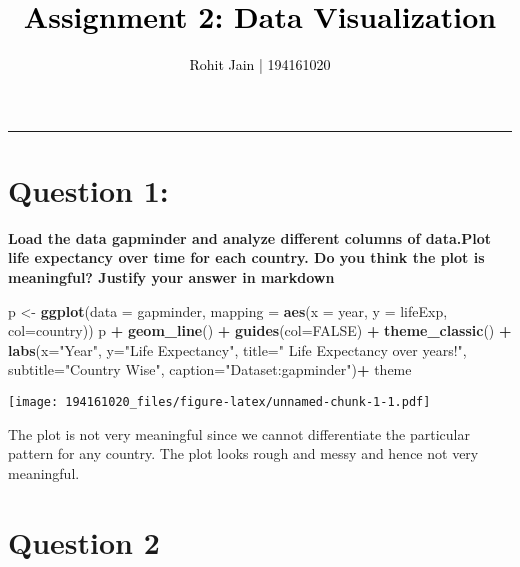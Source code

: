 \documentclass[
]{article}
\title{\textcolor{black}{Assignment 2: Data Visualization}}
\author{\textcolor{black}{Rohit Jain 	 | 	194161020}}
\date{}
\newenvironment{Shaded}{\begin{snugshade}}{\end{snugshade}}
\newcommand{\DataTypeTok}[1]{\textcolor[rgb]{0.13,0.29,0.53}{#1}}
\newcommand{\KeywordTok}[1]{\textcolor[rgb]{0.13,0.29,0.53}{\textbf{#1}}}
\newcommand{\NormalTok}[1]{#1}
\newcommand{\OperatorTok}[1]{\textcolor[rgb]{0.81,0.36,0.00}{\textbf{#1}}}
\newcommand{\OtherTok}[1]{\textcolor[rgb]{0.56,0.35,0.01}{#1}}
\newcommand{\StringTok}[1]{\textcolor[rgb]{0.31,0.60,0.02}{#1}}
\begin{document}
\maketitle

\begin{center}\rule{0.5\linewidth}{0.5pt}\end{center}

\hypertarget{question-1}{%
\section{Question 1:}\label{question-1}}

\textbf{Load the data gapminder and analyze different columns of
data.Plot life expectancy over time for each country. Do you think the
plot is meaningful? Justify your answer in markdown}

\begin{Shaded}
\begin{Highlighting}[]
\NormalTok{p <-}\StringTok{ }\KeywordTok{ggplot}\NormalTok{(}\DataTypeTok{data =}\NormalTok{ gapminder,}
            \DataTypeTok{mapping =} \KeywordTok{aes}\NormalTok{(}\DataTypeTok{x =}\NormalTok{ year,}
                          \DataTypeTok{y =}\NormalTok{ lifeExp, }\DataTypeTok{col=}\NormalTok{country))}
\NormalTok{p }\OperatorTok{+}\StringTok{ }\KeywordTok{geom_line}\NormalTok{() }\OperatorTok{+}
\StringTok{  }\KeywordTok{guides}\NormalTok{(}\DataTypeTok{col=}\OtherTok{FALSE}\NormalTok{) }\OperatorTok{+}\StringTok{ }
\StringTok{  }\KeywordTok{theme_classic}\NormalTok{() }\OperatorTok{+}\StringTok{ }
\StringTok{  }\KeywordTok{labs}\NormalTok{(}\DataTypeTok{x=}\StringTok{"Year"}\NormalTok{, }\DataTypeTok{y=}\StringTok{"Life Expectancy"}\NormalTok{, }
       \DataTypeTok{title=}\StringTok{" Life Expectancy over years!"}\NormalTok{,}
       \DataTypeTok{subtitle=}\StringTok{"Country Wise"}\NormalTok{, }
       \DataTypeTok{caption=}\StringTok{"Dataset:gapminder"}\NormalTok{)}\OperatorTok{+}\StringTok{ }
\StringTok{  }\NormalTok{theme}
\end{Highlighting}
\end{Shaded}

\texttt{[image: 194161020\_files/figure-latex/unnamed-chunk-1-1.pdf]}

The plot is not very meaningful since we cannot differentiate the
particular pattern for any country. The plot looks rough and messy and
hence not very meaningful.

\hypertarget{question-2}{%
\section{Question 2}\label{question-2}}
\end{document}
